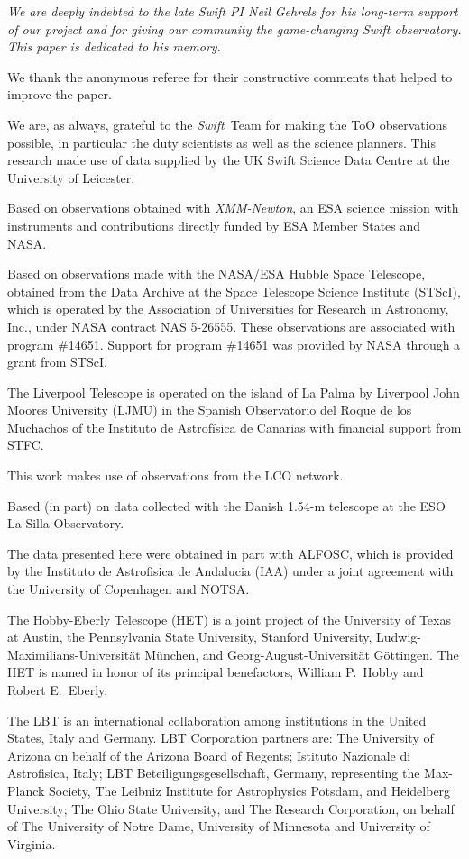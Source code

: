 \documentclass[twocolumn,tighten]{aastex6}
\def\swift{{\it Swift~}}
\def\xmmk{{\it XMM-Newton}}
\begin{document}
\acknowledgements
\textit{We are deeply indebted to the late Swift PI Neil Gehrels for his long-term support of our project and for giving our community the game-changing Swift observatory. This paper is dedicated to his memory.}

We thank the anonymous referee for their constructive comments that helped to improve the paper.

We are, as always, grateful to the \swift Team for making the ToO observations possible, in particular the duty scientists as well as the science planners. This research made use of data supplied by the UK Swift Science Data Centre at the University of Leicester.

Based on observations obtained with \xmmk, an ESA science mission with instruments and contributions directly funded by ESA Member States and NASA.

Based on observations made with the NASA/ESA Hubble Space Telescope, obtained from the Data Archive at the Space Telescope Science Institute (STScI), which is operated by the Association of Universities for Research in Astronomy, Inc., under NASA contract NAS 5-26555.  These observations are associated with program \#14651.  Support for program \#14651 was provided by NASA through a grant from STScI.

The Liverpool Telescope is operated on the island of La Palma by Liverpool John Moores University (LJMU) in the Spanish Observatorio del Roque de los Muchachos of the Instituto de Astrof\'{i}sica de Canarias with financial support from STFC.  

This work makes use of observations from the LCO network. 

Based (in part) on data collected with the Danish 1.54-m telescope at the ESO La Silla Observatory.

The data presented here were obtained in part with ALFOSC, which is provided by the Instituto de Astrofisica de Andalucia (IAA) under a joint agreement with the University of Copenhagen and NOTSA. 

The Hobby-Eberly Telescope (HET) is a joint project of the University of Texas at Austin, the Pennsylvania State University, Stanford University, Ludwig-Maximilians-Universit\"at M\"unchen, and Georg-August-Universit\"at G\"ottingen. The HET is named in honor of its principal benefactors, William P.\ Hobby and Robert E.\ Eberly.

The LBT is an international collaboration among institutions in the United States, Italy and Germany. LBT Corporation partners are: The University of Arizona on behalf of the Arizona Board of Regents; Istituto Nazionale di Astrofisica, Italy; LBT Beteiligungsgesellschaft, Germany, representing the Max-Planck Society, The Leibniz Institute for Astrophysics Potsdam, and Heidelberg University; The Ohio State University, and The Research Corporation, on behalf of The University of Notre Dame, University of Minnesota and University of Virginia.
\end{document}
